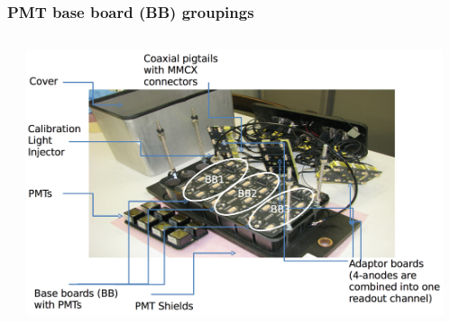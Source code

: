 \documentclass[bigger]{beamer}
\begin{document}
\begin{frame}
\frametitle{PMT base board (BB) groupings}
\label{sec-3-2-2}
\begin{columns} %
\label{sec-3-2-2-1}
\begin{column}{0.75\textwidth}
\label{sec-3-2-2-1-1}

\centering
\includegraphics[width=\textwidth]{fig/hf_local/hf_bb_1.png}
\end{column}
\begin{column}{0.35\textwidth}
\label{sec-3-2-2-1-2}


\end{column}
\end{columns}
\end{frame}
\end{document}
